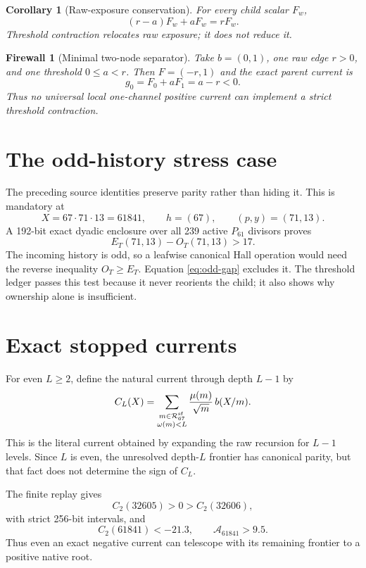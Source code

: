 \documentclass[11pt]{article}
\newtheorem{corollary}[theorem]{Corollary}
\newtheorem{firewall}[theorem]{Firewall}
\newcommand{\Acal}{\mathcal A}
\newcommand{\Rcal}{\mathcal R}
\begin{document}
\begin{corollary}[Raw-exposure conservation]\label{cor:exposure}
For every child scalar $F_w$,
\[
 (r-a)F_w+aF_w=rF_w.
\]
Threshold contraction relocates raw exposure; it does not reduce it.
\end{corollary}

\begin{firewall}[Minimal two-node separator]\label{fw:two-node}
Take $b=(0,1)$, one raw edge $r>0$, and one threshold $0\le a<r$.  Then
$F=(-r,1)$ and the exact parent current is
\[
 g_0=F_0+aF_1=a-r<0.
\]
Thus no universal local one-channel positive current can implement a strict
threshold contraction.
\end{firewall}

\section{The odd-history stress case}

The preceding source identities preserve parity rather than hiding it.  This is
mandatory at
\[
 X=67\cdot71\cdot13=61841,
 \qquad h=(67),
 \qquad(p,y)=(71,13).
\]
A 192-bit exact dyadic enclosure over all 239 active $P_{61}$ divisors proves
\begin{equation}\label{eq:odd-gap}
 E_T(71,13)-O_T(71,13)>17.
\end{equation}
The incoming history is odd, so a leafwise canonical Hall operation would need
the reverse inequality $O_T\ge E_T$.  Equation \eqref{eq:odd-gap} excludes it.
The threshold ledger passes this test because it never reorients the child; it
also shows why ownership alone is insufficient.

\section{Exact stopped currents}

For even $L\ge2$, define the natural current through depth $L-1$ by
\begin{equation}\label{eq:CL}
 C_L(X)=
 \sum_{\substack{m\in\Rcal_{67}^{\mathrm{sf}}\\\omega(m)<L}}
 {\mu(m)\over\sqrt m}\,b(X/m).
\end{equation}
This is the literal current obtained by expanding the raw recursion for
$L-1$ levels.  Since $L$ is even, the unresolved depth-$L$ frontier has canonical
parity, but that fact does not determine the sign of $C_L$.

The finite replay gives
\[
 C_2(32605)>0>C_2(32606),
\]
with strict 256-bit intervals, and
\[
 C_2(61841)<-21.3,
 \qquad
 \Acal_{61841}>9.5.
\]
Thus even an exact negative current can telescope with its remaining frontier
to a positive native root.
\end{document}
